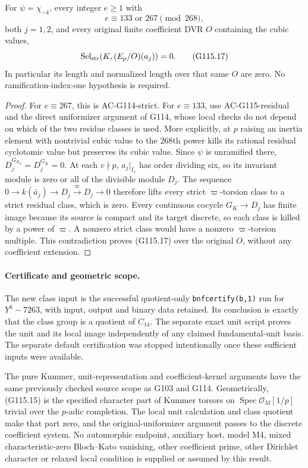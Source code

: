\begin{theorem}
\label{thm:ACG115strict}
For $\psi=\chi_{-4}$, every integer $e\ge1$ with
\[
                         e\equiv133\text{ or }267\pmod{268},
 \tag{G115.16}
\]
both $j=1,2$, and every original finite coefficient DVR $O$
containing the cubic values,
\[
                \operatorname{Sel}_{\rm str}(K,(E_p/O)(a_j))=0.
 \tag{G115.17}
\]
In particular its length and normalized length over that same
$O$ are zero.  No ramification-index-one hypothesis is required.
\end{theorem}

\begin{proof}
For $e\equiv267$, this is AC-G114-strict.
For $e\equiv133$, use AC-G115-residual and the direct
uniformizer argument of G114, whose local checks do not depend
on which of the two residue classes is used.
More explicitly, at $p$ raising an inertia element with
nontrivial cubic value to the $268$th power kills its
rational residual cyclotomic value but preserves its cubic
value.  Since $\psi$ is unramified there,
$D_j^{G_{K_p}}=D_j^{G_K}=0$.
At each $v\nmid p$, $a_j|_{I_v}$ has order dividing six,
so its invariant module is zero or all of the divisible
module $D_j$.
The sequence
$0\to k(\bar a_j)\to D_j\xrightarrow{\varpi}D_j\to0$
therefore lifts every strict $\varpi$-torsion class to a
strict residual class, which is zero.
Every continuous cocycle $G_K\to D_j$ has finite image
because its source is compact and its target discrete, so
each class is killed by a power of $\varpi$.
A nonzero strict class would have a nonzero $\varpi$-torsion
multiple.  This contradiction proves (G115.17) over the
original $O$, without any coefficient extension.
\end{proof}

\paragraph{Certificate and geometric scope.}
The new class input is the successful quotient-only
\texttt{bnfcertify(b,1)} run for $Y^6-7263$, with input,
output and binary data retained.  Its conclusion is exactly
that the class group is a quotient of $C_{14}$.
The separate exact unit script proves the unit and its local
image independently of any claimed fundamental-unit basis.
The separate default certification was stopped intentionally
once these sufficient inputs were available.

The pure Kummer, unit-representation and coefficient-kernel
arguments have the same previously checked source scope as
G103 and G114.  Geometrically, (G115.15) is the specified
character part of Kummer torsors on
$\operatorname{Spec}\mathcal O_M[1/p]$ trivial over the
$p$-adic completion.  The local unit calculation and class
quotient make that part zero, and the original-uniformizer
argument passes to the discrete coefficient system.
No automorphic endpoint, auxiliary host, model M4, mixed
characteristic-zero Bloch--Kato vanishing, other coefficient
prime, other Dirichlet character or relaxed local condition
is supplied or assumed by this result.
